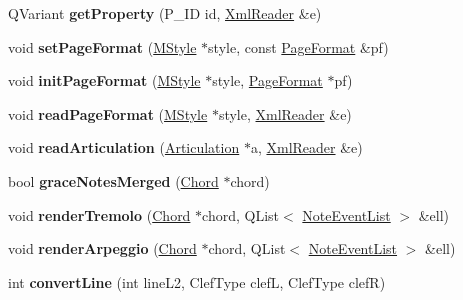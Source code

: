 \begin{DoxyCompactItemize}
Q\+Variant {\bfseries get\+Property} (P\+\_\+\+ID id, \hyperlink{class_ms_1_1_xml_reader}{Xml\+Reader} \&e)
\item 
\mbox{\label{namespace_ms_ac505e51a67c0e643dc15e69d4af76691}} 
void {\bfseries set\+Page\+Format} (\hyperlink{class_ms_1_1_m_style}{M\+Style} $\ast$style, const \hyperlink{class_ms_1_1_page_format}{Page\+Format} \&pf)
\item 
\mbox{\label{namespace_ms_a92afaf1f9f102d08b4faaf40a27de227}} 
void {\bfseries init\+Page\+Format} (\hyperlink{class_ms_1_1_m_style}{M\+Style} $\ast$style, \hyperlink{class_ms_1_1_page_format}{Page\+Format} $\ast$pf)
\item 
\mbox{\label{namespace_ms_a74190c52e6556fec2a1e145da61aa1f6}} 
void {\bfseries read\+Page\+Format} (\hyperlink{class_ms_1_1_m_style}{M\+Style} $\ast$style, \hyperlink{class_ms_1_1_xml_reader}{Xml\+Reader} \&e)
\item 
\mbox{\label{namespace_ms_a76c580fc75cb2217b6b73627f110fa49}} 
void {\bfseries read\+Articulation} (\hyperlink{class_ms_1_1_articulation}{Articulation} $\ast$a, \hyperlink{class_ms_1_1_xml_reader}{Xml\+Reader} \&e)
\item 
\mbox{\label{namespace_ms_aa0113fb5382d48b0ab5b28d86aea4a7d}} 
bool {\bfseries grace\+Notes\+Merged} (\hyperlink{class_ms_1_1_chord}{Chord} $\ast$chord)
\item 
\mbox{\label{namespace_ms_a0fecff8fa0df50bdbf526dc4a1fac678}} 
void {\bfseries render\+Tremolo} (\hyperlink{class_ms_1_1_chord}{Chord} $\ast$chord, Q\+List$<$ \hyperlink{class_ms_1_1_note_event_list}{Note\+Event\+List} $>$ \&ell)
\item 
\mbox{\label{namespace_ms_a20b83fa08a16ab48662fcbab7009d87b}} 
void {\bfseries render\+Arpeggio} (\hyperlink{class_ms_1_1_chord}{Chord} $\ast$chord, Q\+List$<$ \hyperlink{class_ms_1_1_note_event_list}{Note\+Event\+List} $>$ \&ell)
\item 
\mbox{\label{namespace_ms_aa92b76b9d772e8eb86cfeacceb35e9e0}} 
int {\bfseries convert\+Line} (int line\+L2, Clef\+Type clefL, Clef\+Type clefR)
\item 

\end{DoxyCompactItemize}
